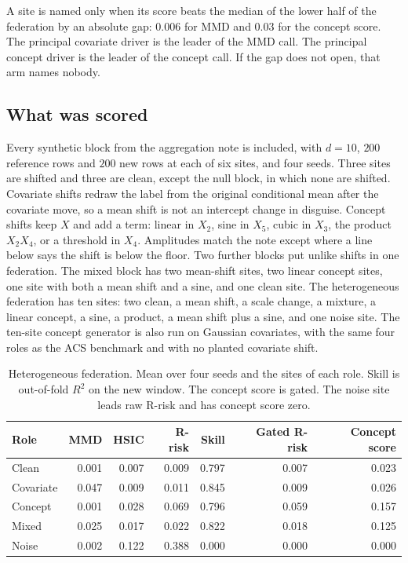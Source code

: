 A site is named only when its score beats the median of the lower half of the federation by an absolute gap: \(0.006\) for MMD and \(0.03\) for the concept score.
The principal covariate driver is the leader of the MMD call.
The principal concept driver is the leader of the concept call.
If the gap does not open, that arm names nobody.

\subsection{What was scored}
\label{sec:kernel-designs}

Every synthetic block from the aggregation note is included, with \(d=10\), \(200\) reference rows and \(200\) new rows at each of six sites, and four seeds.
Three sites are shifted and three are clean, except the null block, in which none are shifted.
Covariate shifts redraw the label from the original conditional mean after the covariate move, so a mean shift is not an intercept change in disguise.
Concept shifts keep \(X\) and add a term: linear in \(X_2\), sine in \(X_5\), cubic in \(X_3\), the product \(X_2 X_4\), or a threshold in \(X_4\).
Amplitudes match the note except where a line below says the shift is below the floor.
Two further blocks put unlike shifts in one federation.
The mixed block has two mean-shift sites, two linear concept sites, one site with both a mean shift and a sine, and one clean site.
The heterogeneous federation has ten sites: two clean, a mean shift, a scale change, a mixture, a linear concept, a sine, a product, a mean shift plus a sine, and one noise site.
The ten-site concept generator is also run on Gaussian covariates, with the same four roles as the ACS benchmark and with no planted covariate shift.

\begin{table}[t]
\centering
\caption{Heterogeneous federation.
Mean over four seeds and the sites of each role.
Skill is out-of-fold \(R^2\) on the new window.
The concept score is gated.
The noise site leads raw R-risk and has concept score zero.}
\label{tab:kernel-roles}
\small
\begin{tabular}{lrrrrrr}
\toprule
Role & MMD & HSIC & R-risk & Skill & Gated R-risk & Concept score \\
\midrule
Clean & 0.001 & 0.007 & 0.009 & 0.797 & 0.007 & 0.023 \\
Covariate & 0.047 & 0.009 & 0.011 & 0.845 & 0.009 & 0.026 \\
Concept & 0.001 & 0.028 & 0.069 & 0.796 & 0.059 & 0.157 \\
Mixed & 0.025 & 0.017 & 0.022 & 0.822 & 0.018 & 0.125 \\
Noise & 0.002 & 0.122 & 0.388 & 0.000 & 0.000 & 0.000 \\
\bottomrule
\end{tabular}
\end{table}

